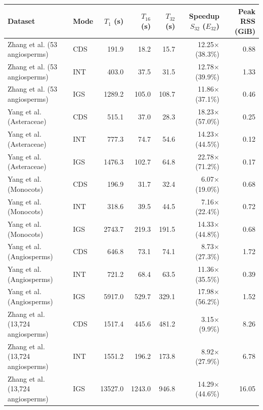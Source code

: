 \begin{tabular}{llrrrrr}
\toprule
Dataset & Mode & $T_1$ (s) & $T_{16}$ (s) & $T_{32}$ (s) & Speedup $S_{32}$ ($E_{32}$) & Peak RSS (GiB) \\
\midrule
Zhang et al. (53 angiosperms) & CDS & 191.9 & 18.2 & 15.7 & 12.25$\times$ (38.3\%) & 0.88 \\
Zhang et al. (53 angiosperms) & INT & 403.0 & 37.5 & 31.5 & 12.78$\times$ (39.9\%) & 1.33 \\
Zhang et al. (53 angiosperms) & IGS & 1289.2 & 105.0 & 108.7 & 11.86$\times$ (37.1\%) & 0.46 \\
\addlinespace
Yang et al. (Asteraceae) & CDS & 515.1 & 37.0 & 28.3 & 18.23$\times$ (57.0\%) & 0.25 \\
Yang et al. (Asteraceae) & INT & 777.3 & 74.7 & 54.6 & 14.23$\times$ (44.5\%) & 0.12 \\
Yang et al. (Asteraceae) & IGS & 1476.3 & 102.7 & 64.8 & 22.78$\times$ (71.2\%) & 0.17 \\
\addlinespace
Yang et al. (Monocots) & CDS & 196.9 & 31.7 & 32.4 & 6.07$\times$ (19.0\%) & 0.68 \\
Yang et al. (Monocots) & INT & 318.6 & 39.5 & 44.5 & 7.16$\times$ (22.4\%) & 0.72 \\
Yang et al. (Monocots) & IGS & 2743.7 & 219.3 & 191.5 & 14.33$\times$ (44.8\%) & 0.68 \\
\addlinespace
Yang et al. (Angiosperms) & CDS & 646.8 & 73.1 & 74.1 & 8.73$\times$ (27.3\%) & 1.72 \\
Yang et al. (Angiosperms) & INT & 721.2 & 68.4 & 63.5 & 11.36$\times$ (35.5\%) & 0.39 \\
Yang et al. (Angiosperms) & IGS & 5917.0 & 529.7 & 329.1 & 17.98$\times$ (56.2\%) & 1.52 \\
\addlinespace
Zhang et al. (13,724 angiosperms) & CDS & 1517.4 & 445.6 & 481.2 & 3.15$\times$ (9.9\%) & 8.26 \\
Zhang et al. (13,724 angiosperms) & INT & 1551.2 & 196.2 & 173.8 & 8.92$\times$ (27.9\%) & 6.78 \\
Zhang et al. (13,724 angiosperms) & IGS & 13527.0 & 1243.0 & 946.8 & 14.29$\times$ (44.6\%) & 16.05 \\
\bottomrule
\end{tabular}
